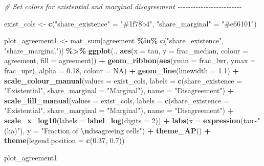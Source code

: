 \documentclass[
  11pt,
]{article}
\newenvironment{Shaded}{\begin{snugshade}}{\end{snugshade}}
\newcommand{\AttributeTok}[1]{\textcolor[rgb]{0.13,0.29,0.53}{#1}}
\newcommand{\CommentTok}[1]{\textcolor[rgb]{0.56,0.35,0.01}{\textit{#1}}}
\newcommand{\ConstantTok}[1]{\textcolor[rgb]{0.56,0.35,0.01}{#1}}
\newcommand{\DecValTok}[1]{\textcolor[rgb]{0.00,0.00,0.81}{#1}}
\newcommand{\FloatTok}[1]{\textcolor[rgb]{0.00,0.00,0.81}{#1}}
\newcommand{\FunctionTok}[1]{\textcolor[rgb]{0.13,0.29,0.53}{\textbf{#1}}}
\newcommand{\NormalTok}[1]{#1}
\newcommand{\OtherTok}[1]{\textcolor[rgb]{0.56,0.35,0.01}{#1}}
\newcommand{\SpecialCharTok}[1]{\textcolor[rgb]{0.81,0.36,0.00}{\textbf{#1}}}
\newcommand{\StringTok}[1]{\textcolor[rgb]{0.31,0.60,0.02}{#1}}
\begin{document}
\begin{Shaded}
\begin{Highlighting}[]
\CommentTok{\# Set colors for existential and marginal disagreement {-}{-}{-}{-}{-}{-}{-}{-}{-}{-}{-}{-}{-}{-}{-}{-}{-}{-}{-}{-}{-}{-}{-}{-}{-}}

\NormalTok{exist\_cols }\OtherTok{\textless{}{-}} \FunctionTok{c}\NormalTok{(}\StringTok{"share\_existence"} \OtherTok{=} \StringTok{"\#1f78b4"}\NormalTok{, }\StringTok{"share\_marginal"} \OtherTok{=} \StringTok{"\#e66101"}\NormalTok{)}

\NormalTok{plot\_agreement1 }\OtherTok{\textless{}{-}}\NormalTok{ mat\_sum[agreement }\SpecialCharTok{\%in\%} \FunctionTok{c}\NormalTok{(}\StringTok{"share\_existence"}\NormalTok{, }\StringTok{"share\_marginal"}\NormalTok{)] }\SpecialCharTok{\%\textgreater{}\%}
  \FunctionTok{ggplot}\NormalTok{(., }\FunctionTok{aes}\NormalTok{(}\AttributeTok{x =}\NormalTok{ tau, }\AttributeTok{y =}\NormalTok{ frac\_median, }\AttributeTok{colour =}\NormalTok{ agreement, }\AttributeTok{fill =}\NormalTok{ agreement)) }\SpecialCharTok{+}
  \FunctionTok{geom\_ribbon}\NormalTok{(}\FunctionTok{aes}\NormalTok{(}\AttributeTok{ymin =}\NormalTok{ frac\_lwr, }\AttributeTok{ymax =}\NormalTok{ frac\_upr), }\AttributeTok{alpha =} \FloatTok{0.18}\NormalTok{, }\AttributeTok{colour =} \ConstantTok{NA}\NormalTok{) }\SpecialCharTok{+}
  \FunctionTok{geom\_line}\NormalTok{(}\AttributeTok{linewidth =} \FloatTok{1.1}\NormalTok{) }\SpecialCharTok{+}
  \FunctionTok{scale\_colour\_manual}\NormalTok{(}\AttributeTok{values =}\NormalTok{ exist\_cols,}
                      \AttributeTok{labels =} \FunctionTok{c}\NormalTok{(}\AttributeTok{share\_existence =} \StringTok{"Existential"}\NormalTok{,}
                                 \AttributeTok{share\_marginal =} \StringTok{"Marginal"}\NormalTok{),}
                      \AttributeTok{name =} \StringTok{"Disagreement"}\NormalTok{) }\SpecialCharTok{+}
  \FunctionTok{scale\_fill\_manual}\NormalTok{(}\AttributeTok{values =}\NormalTok{ exist\_cols,}
                    \AttributeTok{labels =} \FunctionTok{c}\NormalTok{(}\AttributeTok{share\_existence =} \StringTok{"Existential"}\NormalTok{,}
                               \AttributeTok{share\_marginal =} \StringTok{"Marginal"}\NormalTok{),}
                    \AttributeTok{name =} \StringTok{"Disagreement"}\NormalTok{) }\SpecialCharTok{+}
  \FunctionTok{scale\_x\_log10}\NormalTok{(}\AttributeTok{labels =} \FunctionTok{label\_log}\NormalTok{(}\AttributeTok{digits =} \DecValTok{2}\NormalTok{)) }\SpecialCharTok{+}
  \FunctionTok{labs}\NormalTok{(}\AttributeTok{x =} \FunctionTok{expression}\NormalTok{(tau}\SpecialCharTok{\textasciitilde{}}\StringTok{"(ha)"}\NormalTok{), }\AttributeTok{y =} \StringTok{"Fraction of }\SpecialCharTok{\textbackslash{}n}\StringTok{disagreeing cells"}\NormalTok{) }\SpecialCharTok{+}
  \FunctionTok{theme\_AP}\NormalTok{() }\SpecialCharTok{+}
  \FunctionTok{theme}\NormalTok{(}\AttributeTok{legend.position =} \FunctionTok{c}\NormalTok{(}\FloatTok{0.37}\NormalTok{, }\FloatTok{0.7}\NormalTok{))}


\NormalTok{plot\_agreement1}
\end{Highlighting}
\end{Shaded}
\end{document}
